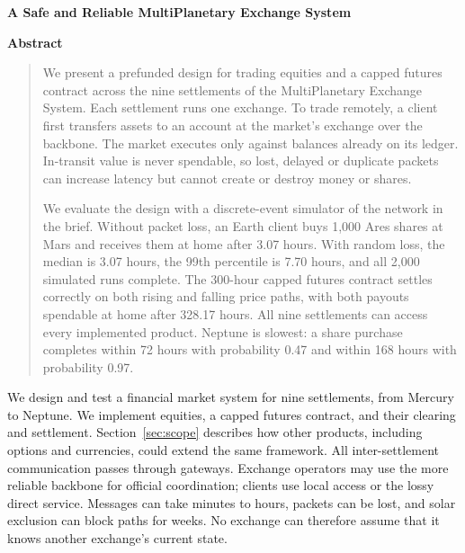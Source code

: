 \documentclass[10pt,letterpaper]{article}
\makeatletter
\renewcommand\section{\@startsection{section}{1}{\z@}{-9pt plus -2pt minus -1pt}{3pt}{\normalfont\large\bfseries}}
\makeatother
\begin{document}
\begin{center}{\LARGE\bfseries A Safe and Reliable MultiPlanetary Exchange System\par}\vspace{3pt}\end{center}
\begin{center}\textbf{Abstract}\end{center}\vspace{-6pt}\begin{quote}

We present a prefunded design for trading equities and a capped futures contract across the nine settlements of the
MultiPlanetary Exchange System. Each settlement runs one exchange. To trade remotely, a client first transfers assets
to an account at the market's exchange over the backbone. The market executes only against balances already on its
ledger. In-transit value is never spendable, so lost, delayed or duplicate packets can increase latency but cannot
create or destroy money or shares.

We evaluate the design with a discrete-event simulator of the network in the brief. Without packet loss, an Earth
client buys 1,000 Ares shares at Mars and receives them at home after 3.07 hours. With random loss, the median is
3.07 hours, the 99th percentile is 7.70 hours, and all 2,000 simulated runs complete. The 300-hour capped futures
contract settles correctly on both rising and falling price paths, with both payouts spendable at home after
328.17 hours. All nine settlements can access every implemented product. Neptune is slowest: a share purchase
completes within 72 hours with probability 0.47 and within 168 hours with probability 0.97.
\end{quote}

\section{Introduction}
We design and test a financial market system for nine settlements, from Mercury to Neptune. We implement equities,
a capped futures contract, and their clearing and settlement. Section~\ref{sec:scope} describes how other products,
including options and currencies, could extend the same framework. All inter-settlement communication passes through
gateways. Exchange operators may use the more reliable backbone for official coordination; clients use local access
or the lossy direct service. Messages can take minutes to hours, packets can be lost, and solar exclusion can block
paths for weeks. No exchange can therefore assume that it knows another exchange's current state.
\end{document}

